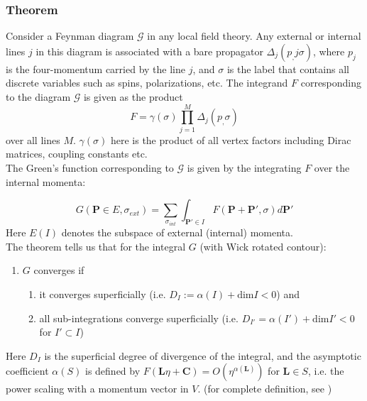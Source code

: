 \documentclass{scrartcl}
\begin{document}
\subsubsection{Theorem}
Consider a Feynman diagram $\mathcal{G}$ in any local field theory. Any external or internal lines $j$ in this diagram is associated with a bare propagator $\Delta_j(p_,j\sigma)$, where $p_j$ is the four-momentum carried by the line $j$, and $\sigma$ is the label that contains all discrete variables such as spins, polarizations, etc. The integrand $F$ corresponding to the diagram $\mathcal{G}$  is given as the product
\begin{equation}
    F= \gamma(\sigma)\prod_{j=1}^M \Delta_j(p_,\sigma)
\end{equation}
over all lines $M$. $\gamma(\sigma)$ here is the product of all vertex factors including Dirac matrices, coupling constants etc. \\

The Green's function corresponding to $\mathcal{G}$ is given by the integrating $F$ over the internal momenta:

\begin{equation}
    G(\mathbf{P}\in E, \sigma_{ext}) = \sum_{\sigma_{int}}\int_{\mathbf{P'}\in I}F(\mathbf{P+P'},\sigma) d\mathbf{P'}
\end{equation}
Here $E(I)$ denotes the subspace of external (internal) momenta.\\

The theorem tells us that for the integral $G$ (with Wick rotated contour):
\begin{enumerate}
    \item $G$ converges if 
    \begin{enumerate}
        \item it converges superficially (i.e. $D_I:=\alpha(I)+\text{dim}I<0$) and 
        \item all sub-integrations converge superficially (i.e. $D_{I'}=\alpha(I')+\text{dim}I'<0$ for $I'\subset I$)
    \end{enumerate}
\end{enumerate}
Here $D_I$ is the superficial degree of divergence of the integral, and the asymptotic coefficient $\alpha(S)$ is defined by $F(\mathbf{L}\eta+\mathbf{C}) = O(\eta^{\alpha(\mathbf{L})})$ for $\mathbf{L}\in S$, i.e. the power scaling with a momentum vector in $V$. (for complete definition, see \cite[\S III]{weinberg})
\end{document}
